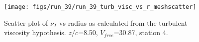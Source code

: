\begin{figure}[H]
\centering
\texttt{[image: figs/run\_39/run\_39\_turb\_visc\_vs\_r\_meshscatter]}
\caption{Scatter plot of $\nu_T$ vs radius as calculated from the turbulent viscosity hypothesis. $z/c$=8.50, $V_{free}$=30.87, station 4.}
\label{fig:run_39_turb_visc_vs_r_meshscatter}
\end{figure}


